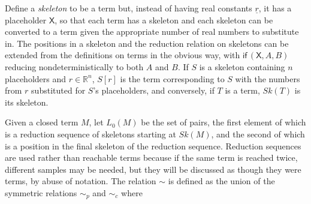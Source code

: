 \documentclass{article}
\newcommand{\tif}[3]{\textsf{if}\,(#1, #2, #3)} %
\newcommand{\skeletonPlaceholder}{\textsf{X}} %
\theoremstyle{definition}
\theoremstyle{lemma}
\theoremstyle{remark}
\begin{document}
Define a \emph{skeleton} to be a term but, instead of having real constants $\underline r$, it has a placeholder $\skeletonPlaceholder$, so that each term has a skeleton and each skeleton can be converted to a term given the appropriate number of real numbers to substitute in. The positions in a skeleton and the reduction relation on skeletons can be extended from the definitions on terms in the obvious way, with $\tif{\skeletonPlaceholder}{A}{B}$ reducing nondeterministically to both $A$ and $B$. If $S$ is a skeleton containing $n$ placeholders and $r \in \mathbb R^n$, $S[r]$ is the term corresponding to $S$ with the numbers from $r$ substituted for $S$'s placeholders, and conversely, if $T$ is a term, $Sk(T)$ is its skeleton.

Given a closed term $M$, let $L_0(M)$ be the set of pairs, the first element of which is a reduction sequence of skeletons starting at $Sk(M)$, and the second of which is a position in the final skeleton of the reduction sequence.  Reduction sequences are used rather than reachable terms because if the same term is reached twice, different samples may be needed, but they will be discussed as though they were terms, by abuse of notation.  The relation $\sim$ is defined as the union of the symmetric relations $\sim_p$  and $\sim_c$  where
\end{document}
